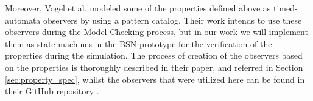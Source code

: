 Moreover, Vogel et al. \cite{vogel2022property} modeled some of the properties defined above as timed-automata observers by using a pattern catalog. Their work intends to use these observers during the Model Checking process, but in our work we will implement them as state machines in the BSN prototype for the verification of the properties during the simulation. The process of creation of the observers based on the properties is thoroughly described in their paper, and referred in Section \ref{sec:property_spec}, whilst the observers that were utilized here can be found in their GitHub repository \cite{2022PSP}.
